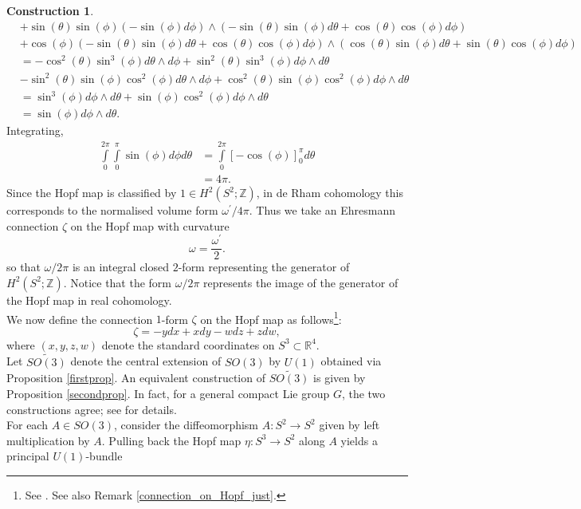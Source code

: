 \documentclass{article}
\theoremstyle{plain}
\theoremstyle{definition}
\newtheorem{const}[thm]{Construction}
\begin{document}
\begin{const}
\begin{align*}
& + \sin(\theta) \sin(\phi) \left(-\sin(\phi) d\phi\right) \wedge \left(-\sin(\theta) \sin(\phi) d\theta + \cos(\theta) \cos(\phi) d\phi\right) \\
& + \cos(\phi)\left(-\sin(\theta) \sin(\phi) d\theta + \cos(\theta) \cos(\phi) d\phi\right) \wedge \left(\cos(\theta) \sin(\phi) d\theta + \sin(\theta) \cos(\phi) d\phi\right) \\
& = -\cos^2(\theta)\sin^3(\phi) d\theta \wedge d\phi + \sin^2(\theta) \sin^3(\phi) d\phi \wedge d\theta \\
& - \sin^2(\theta)\sin(\phi)\cos^2(\phi) d\theta \wedge d\phi + \cos^2(\theta)\sin(\phi)\cos^2(\phi) d\phi \wedge d\theta \\
& = \sin^3(\phi) d\phi \wedge d\theta + \sin(\phi) \cos^2(\phi) d\phi \wedge d\theta \\
& =  \sin(\phi) d\phi \wedge d\theta.
\end{align*}
Integrating,
\begin{align*}
\int\limits_0^{2\pi}\int\limits_0^{\pi} \sin(\phi) d\phi d\theta & = \int\limits_0^{2\pi}[-\cos(\phi)]_0^\pi d\theta \\
& = 4\pi.
\end{align*} 
Since the Hopf map is classified by $1 \in H^2(S^2;\mathbb{Z})$, in de Rham cohomology this corresponds to the normalised volume form $\omega^\prime/4\pi$. Thus we take an Ehresmann connection $\zeta$ on the Hopf map with curvature
\[
\omega = \frac{\omega^\prime}{2}.
\]
so that $\omega/2\pi$ is an integral closed $2$-form representing the generator of $H^2(S^2;\mathbb{Z})$. Notice that the form $\omega/2\pi$ represents the image of the generator of the Hopf map in real cohomology. \\
We now define the connection $1$-form $\zeta$ on the Hopf map as follows\footnote{See \cite[on page 269]{MR3012377}. See also Remark \ref{connection_on_Hopf_just}.}:
\begin{equation}\label{connonHopf}
\zeta = -ydx + xdy -wdz + zdw,
\end{equation}
where $(x,y,z,w)$ denote the standard coordinates on $S^3 \subset \mathbb{R}^4$. \\
Let $\widetilde{SO(3)}$ denote the central extension of $SO(3)$ by $U(1)$ obtained via Proposition \ref{firstprop}. An equivalent construction of $\widetilde{SO(3)}$ is given by Proposition \ref{secondprop}. In fact, for a general compact Lie group $G$, the two constructions agree; see \cite[Page 54]{MR900587} for details. \\
For each $A \in SO(3)$, consider the diffeomorphism $A:S^2 \longrightarrow S^2$ given by left multiplication by $A$. Pulling back the Hopf map $\eta:S^3 \longrightarrow S^2$ along $A$ yields a principal $U(1)$-bundle

\end{const}
\end{document}

